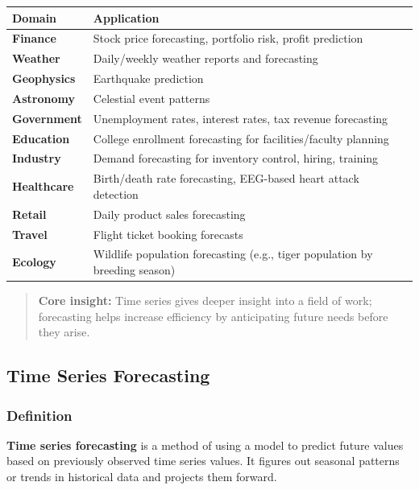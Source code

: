 \documentclass[12pt,openany]{book}
\begin{document}
\begin{center}
\begin{tabular}{|L{0.28\textwidth}|L{0.62\textwidth}|}
\hline
Domain & Application \\
\hline
\textbf{Finance} & Stock price forecasting, portfolio risk, profit prediction \\
\hline
\textbf{Weather} & Daily/weekly weather reports and forecasting \\
\hline
\textbf{Geophysics} & Earthquake prediction \\
\hline
\textbf{Astronomy} & Celestial event patterns \\
\hline
\textbf{Government} & Unemployment rates, interest rates, tax revenue forecasting \\
\hline
\textbf{Education} & College enrollment forecasting for facilities/faculty planning \\
\hline
\textbf{Industry} & Demand forecasting for inventory control, hiring, training \\
\hline
\textbf{Healthcare} & Birth/death rate forecasting, EEG-based heart attack detection \\
\hline
\textbf{Retail} & Daily product sales forecasting \\
\hline
\textbf{Travel} & Flight ticket booking forecasts \\
\hline
\textbf{Ecology} & Wildlife population forecasting (e.g., tiger population by breeding season) \\
\hline
\end{tabular}
\end{center}

\begin{quote}
\textbf{Core insight:} Time series gives deeper insight into a field of work; forecasting helps increase efficiency by anticipating future needs before they arise.\par

\end{quote}

\subsection{Time Series Forecasting}

\subsubsection{Definition}

\textbf{Time series forecasting} is a method of using a model to predict future values based on previously observed time series values. It figures out seasonal patterns or trends in historical data and projects them forward.
\end{document}
